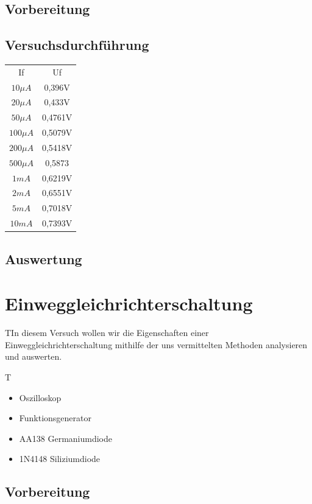 \documentclass{article}
\begin{document}
\subsection{Vorbereitung}

\subsection{Versuchsdurchführung}


    \begin{tabular}{|c|c|}
      If & Uf  \\
      $10\mu A$ & 0,396V\\
      $20\mu A$ & 0,433V\\
      $50\mu A$ & 0,4761V\\
      $100\mu A$ & 0,5079V\\
      $200\mu A$ & 0,5418V\\
      $500\mu A$ & 0,5873\\
      $1mA$ & 0,6219V\\
      $2mA$ & 0,6551V\\
      $5mA$ & 0,7018V\\
      $10mA$ & 0,7393V\\
    \end{tabular}
\subsection{Auswertung}

\section{Einweggleichrichterschaltung}
\begin{task}
  TIn diesem Versuch wollen wir die Eigenschaften einer Einweggleichrichterschaltung mithilfe der uns 
  vermittelten Methoden analysieren und auswerten.
\end{task}

\begin{devlist}
  T\begin{itemize}
    \item Oszilloskop
    \item Funktionsgenerator
    \item AA138 Germaniumdiode
    \item 1N4148 Siliziumdiode
  \end{itemize}
\end{devlist}

\subsection{Vorbereitung}
\end{document}
